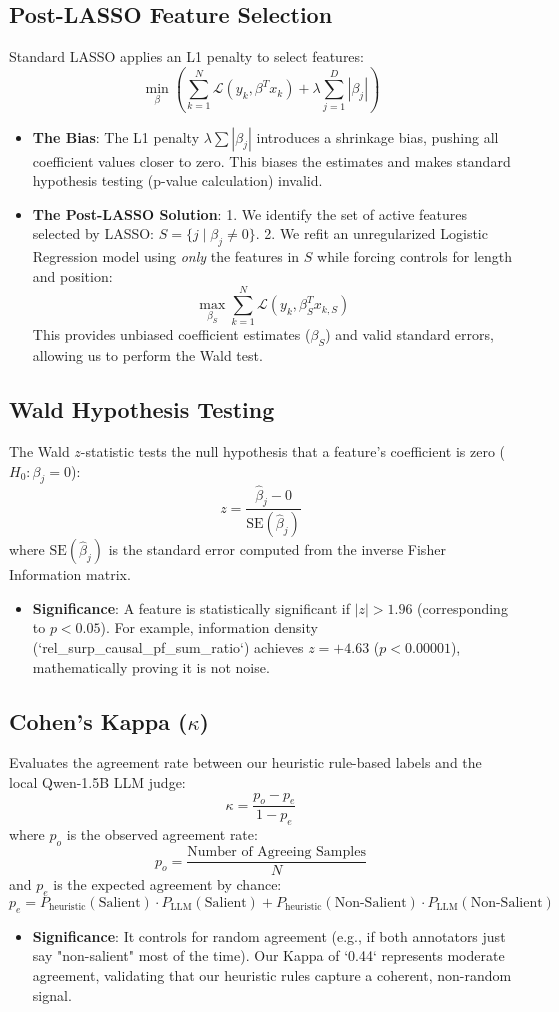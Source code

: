 \documentclass[11pt,a4paper]{article}
\begin{document}
\subsection{Post-LASSO Feature Selection}
Standard LASSO applies an L1 penalty to select features:
\[
\min_{\beta} \left( \sum_{k=1}^N \mathcal{L}(y_k, \beta^T x_k) + \lambda \sum_{j=1}^D |\beta_j| \right)
\]
\begin{itemize}
    \item \textbf{The Bias}: The L1 penalty $\lambda \sum |\beta_j|$ introduces a shrinkage bias, pushing all coefficient values closer to zero. This biases the estimates and makes standard hypothesis testing (p-value calculation) invalid.
    \item \textbf{The Post-LASSO Solution}:
      1. We identify the set of active features selected by LASSO: $S = \{j \mid \beta_j \neq 0\}$.
      2. We refit an unregularized Logistic Regression model using \textit{only} the features in $S$ while forcing controls for length and position:
      \[
      \max_{\beta_S} \sum_{k=1}^N \mathcal{L}(y_k, \beta_S^T x_{k, S})
      \]
      This provides unbiased coefficient estimates ($\beta_S$) and valid standard errors, allowing us to perform the Wald test.
\end{itemize}

\subsection{Wald Hypothesis Testing}
The Wald $z$-statistic tests the null hypothesis that a feature's coefficient is zero ($H_0: \beta_j = 0$):
\[
z = \frac{\hat{\beta}_j - 0}{\text{SE}(\hat{\beta}_j)}
\]
where $\text{SE}(\hat{\beta}_j)$ is the standard error computed from the inverse Fisher Information matrix.
\begin{itemize}
    \item \textbf{Significance}: A feature is statistically significant if $|z| > 1.96$ (corresponding to $p < 0.05$). For example, information density (`rel\_surp\_causal\_pf\_sum\_ratio`) achieves $z = +4.63$ ($p < 0.00001$), mathematically proving it is not noise.
\end{itemize}

\subsection{Cohen's Kappa ($\kappa$)}
Evaluates the agreement rate between our heuristic rule-based labels and the local Qwen-1.5B LLM judge:
\[
\kappa = \frac{p_o - p_e}{1 - p_e}
\]
where $p_o$ is the observed agreement rate:
\[
p_o = \frac{\text{Number of Agreeing Samples}}{N}
\]
and $p_e$ is the expected agreement by chance:
\[
p_e = P_{\text{heuristic}}(\text{Salient}) \cdot P_{\text{LLM}}(\text{Salient}) + P_{\text{heuristic}}(\text{Non-Salient}) \cdot P_{\text{LLM}}(\text{Non-Salient})
\]
\begin{itemize}
    \item \textbf{Significance}: It controls for random agreement (e.g., if both annotators just say "non-salient" most of the time). Our Kappa of `0.44` represents moderate agreement, validating that our heuristic rules capture a coherent, non-random signal.
\end{itemize}
\end{document}
